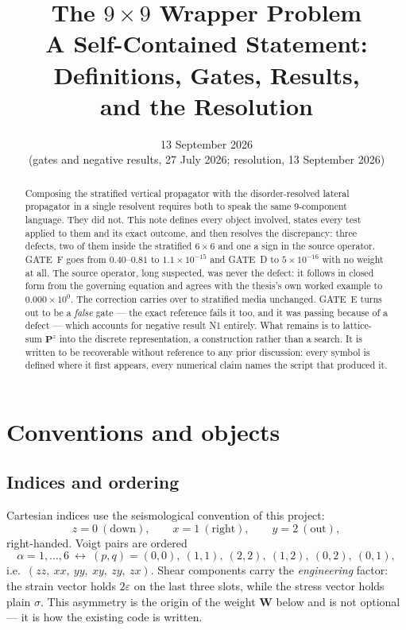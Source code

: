 \documentclass[11pt,a4paper]{article}
\title{\bfseries The $9\times9$ Wrapper Problem\\[4pt]
\large A Self-Contained Statement: Definitions, Gates, Results,\\
and the Resolution}
\author{}
\date{13 September 2026\\[2pt]
\small\normalfont(gates and negative results, 27 July 2026;
resolution, 13 September 2026)}
\newcommand{\bW}{\mathbf{W}}
\newcommand{\bP}{\mathbf{P}}
\begin{document}
\maketitle

\begin{abstract}
\noindent
Composing the stratified vertical propagator with the disorder-resolved lateral
propagator in a single resolvent requires both to speak the same
$9$-component language.  They did not.  This note defines every object
involved, states every test applied to them and its exact outcome, and then
resolves the discrepancy: three defects, two of them inside the stratified
$6\times6$ and one a sign in the source operator.  GATE~F goes from
$0.40$--$0.81$ to $1.1\times10^{-15}$ and GATE~D to $5\times10^{-16}$ with no
weight at all.  The source operator, long suspected, was never the defect: it
follows in closed form from the governing equation and agrees with the thesis's
own worked example to $0.000\times10^{0}$.  The correction carries over to
stratified media unchanged.  GATE~E turns out to be a \emph{false} gate --- the
exact reference fails it too, and it was passing because of a defect --- which
accounts for negative result N1 entirely.  What remains is to lattice-sum
$\bP^{z}$ into the discrete representation, a construction rather than a search.
It is written to be recoverable without reference to any prior discussion:
every symbol is defined where it first appears, every numerical claim names the
script that produced it.
\end{abstract}

\tableofcontents

\section{Conventions and objects}

\subsection{Indices and ordering}

Cartesian indices use the seismological convention of this project:
\begin{equation}
  z = 0 \ (\text{down}), \qquad x = 1 \ (\text{right}), \qquad y = 2 \ (\text{out}),
\end{equation}
right-handed.  Voigt pairs are ordered
\begin{equation}\label{eq:voigt}
  \alpha = 1,\dots,6 \ \longleftrightarrow\ (p,q) =
  (0,0),\ (1,1),\ (2,2),\ (1,2),\ (0,2),\ (0,1),
\end{equation}
i.e.\ $(zz,\ xx,\ yy,\ xy,\ zy,\ zx)$.  Shear components carry the
\emph{engineering} factor: the strain vector holds $2\varepsilon$ on the last
three slots, while the stress vector holds plain $\sigma$.  This asymmetry is
the origin of the weight $\bW$ below and is not optional --- it is how the
existing code is written.
\end{document}
